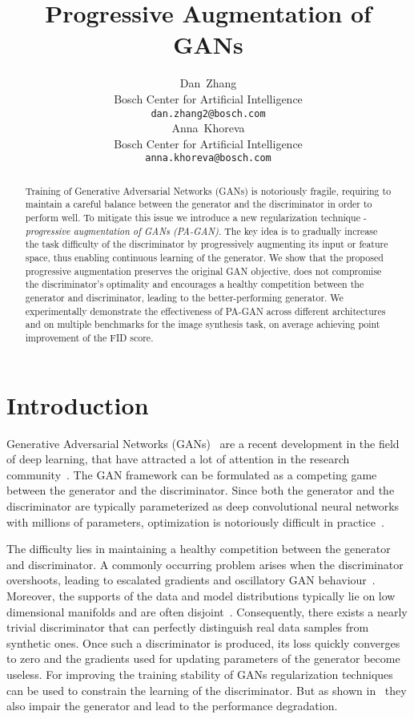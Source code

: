 \documentclass{article}
\title{Progressive Augmentation of GANs}
\author{Dan~Zhang\\
	Bosch Center for Artificial Intelligence\\
\texttt{dan.zhang2@bosch.com} \\
\And
	Anna~Khoreva \\
	Bosch Center for Artificial Intelligence\\
\texttt{anna.khoreva@bosch.com} \\
}
\begin{document}
\maketitle

\begin{abstract}
	Training of Generative Adversarial Networks (GANs) is notoriously fragile, 
requiring to maintain a careful balance between the generator and the discriminator in order to perform well. To mitigate this issue we introduce a new regularization technique -  \emph{progressive augmentation of GANs (PA-GAN)}. The key idea is to gradually increase the task difficulty of the discriminator by progressively augmenting its input or feature space, thus enabling continuous learning of the generator. We show that the proposed progressive augmentation preserves the original GAN objective, does not compromise the discriminator's optimality and encourages a healthy competition between the generator and discriminator, leading to the better-performing generator. We experimentally demonstrate the effectiveness of PA-GAN across different architectures and 
on multiple benchmarks for the image synthesis task, on average achieving  point improvement of the FID score.

	
\end{abstract}

\section{\label{sec:Introduction}Introduction}
Generative Adversarial Networks (GANs)~\cite{goodfellow2014generative} are a recent development in the field of deep learning, that have attracted a lot of attention in the research community~\cite{Radford2016UnsupervisedRL,SalimansNIPS2016,Arjovsky2017WGAN,karras2018progressive}. The GAN framework can be formulated as a competing game between the generator and the discriminator. Since both the generator and the discriminator are typically parameterized as deep convolutional neural networks with millions of parameters, optimization is notoriously difficult in practice~\cite{Arjovsky2017WGAN,gulrajani_NIPS2017,miyato2018spectral}.

The difficulty lies in maintaining a healthy competition between the generator and discriminator. A commonly occurring problem arises when the discriminator overshoots, leading to escalated gradients and oscillatory GAN behaviour~\cite{MeschederICML2018, Brock2019}. Moreover, the supports of the data and model distributions typically lie on low dimensional manifolds and are often disjoint~\cite{Arjovsky2017TowardsPM}. Consequently, there exists a nearly trivial discriminator that can perfectly distinguish real data samples from synthetic ones. Once such a discriminator is produced, its loss quickly converges to zero and the gradients used for updating parameters of the generator become useless. For improving the training stability of GANs regularization techniques~\cite{Roth_NIPS2017,gulrajani_NIPS2017} can be used to constrain the learning of the discriminator. But as shown in~\cite{Brock2019,Kurach2018GANlandscape} they also impair the generator and lead to the performance degradation.
\end{document}
